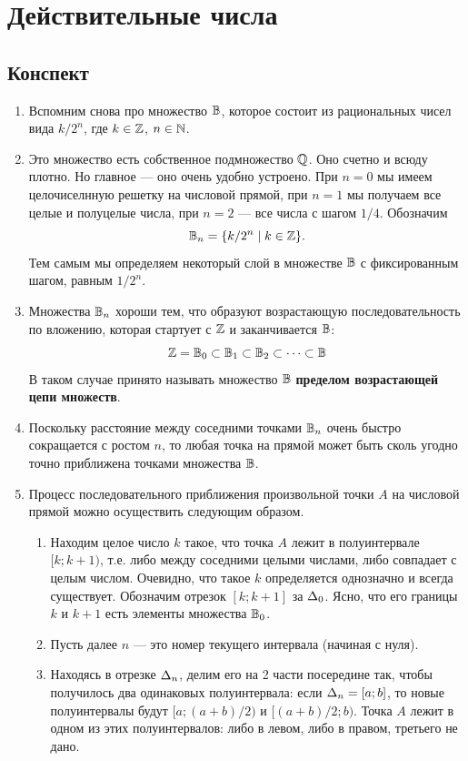 \section{Действительные числа}

\subsection*{Конспект}

\begin{enumerate}
\item Вспомним снова про множество $\mathbb B$, которое состоит из рациональных чисел вида $k/2^n$, где $k\in\mathbb Z$, $n\in\mathbb N$.
\item Это множество есть собственное подмножество $\mathbb Q$. Оно счетно и всюду плотно. Но главное --- оно очень удобно устроено.
При $n=0$ мы имеем целочиселнную решетку на числовой прямой, при $n=1$ мы получаем все целые и полуцелые числа, при $n=2$ --- все числа с шагом $1/4$. Обозначим
$$
\mathbb B_n=\{k/2^n\mid k\in\mathbb Z\}.
$$
Тем самым мы определяем некоторый слой в множестве $\mathbb B$ с фиксированным шагом, равным $1/2^n$.
\item Множества $\mathbb B_n$ хороши тем, что образуют возрастающую последовательность по вложению, которая стартует с $\mathbb Z$ и заканчивается $\mathbb B$:
$$
\mathbb Z=\mathbb B_0\subset\mathbb B_1\subset\mathbb B_2\subset\dots\subset\mathbb B
$$
В таком случае принято называть множество $\mathbb B$ \textbf{пределом возрастающей цепи множеств}.
\item Поскольку расстояние между соседними точками $\mathbb B_n$ очень быстро сокращается с ростом $n$, то любая точка на прямой может быть сколь угодно точно приближена точками множества $\mathbb B$.
\item Процесс последовательного приближения произвольной точки $A$ на числовой прямой можно осуществить следующим образом.
\begin{enumerate}[{\bf Step1}]
\item Находим целое число $k$ такое, что точка $A$ лежит в полуинтервале $[k;k+1)$, т.е. либо между соседними целыми числами, либо совпадает с целым числом. Очевидно, что такое $k$ определяется однозначно и всегда существует. Обозначим отрезок $[k;k+1]$ за $\Delta_0$. Ясно, что его границы $k$ и $k+1$ есть элементы множества $\mathbb B_0$.
\item Пусть далее $n$ --- это номер текущего интервала (начиная с нуля).
\item Находясь в отрезке $\Delta_n$, делим его на 2 части посередине так, чтобы получилось два одинаковых полуинтервала: если $\Delta_n=[a;b]$, то новые полуинтервалы будут $[a;(a+b)/2)$ и $[(a+b)/2;b)$. Точка $A$ лежит в одном из этих полуинтервалов: либо в левом, либо в правом, третьего не дано.


\end{enumerate}
\end{enumerate}
